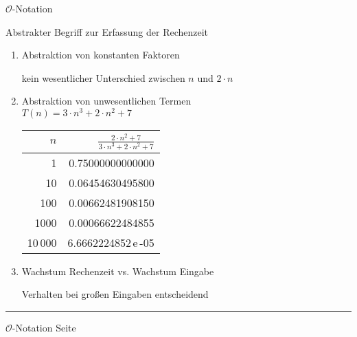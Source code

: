 \documentclass{slides}
\newcommand{\Oh}{\mathcal{O}}
\newcounter{mypage}
\newcommand{\bruch}[2]{\frac{\displaystyle#1}{\displaystyle#2}}
\begin{document}
\begin{slide}{}
\begin{center}
$\Oh$-Notation
\end{center}

\footnotesize
Abstrakter Begriff zur Erfassung der Rechenzeit
\begin{enumerate}
\item Abstraktion von konstanten Faktoren

      kein wesentlicher Unterschied zwischen $n$ und $2\cdot n$
\item Abstraktion von unwesentlichen Termen 
      \\[0.5cm]
      \hspace*{1.3cm} $T(n) = 3 \cdot n^3 + 2 \cdot n^2 + 7$ 
      \\[0.5cm]
      \hspace*{1.3cm} 
      \begin{tabular}{|r|r|}
        \hline
        $n$  & \rule{0pt}{16pt} $\bruch{2 \cdot n^2 + 7}{3 \cdot n^3 + 2 \cdot n^2 + 7}$ \\[0.3cm]
        \hline
        \hline
        1       &  0.75000000000000  \\
        10      &  0.06454630495800  \\
        100     &  0.00662481908150  \\
        1000    &  0.00066622484855  \\
        10\,000 &  6.6662224852\,e\,-05  \\
       \hline
      \end{tabular}
\item Wachstum Rechenzeit vs. Wachstum Eingabe

      Verhalten bei gro{\ss}en Eingaben entscheidend 
\end{enumerate}

\vspace*{\fill}
\tiny \addtocounter{mypage}{1}
\rule{17cm}{1mm}
$\Oh$-Notation  \hspace*{\fill} Seite 
\end{slide}

\end{document}
